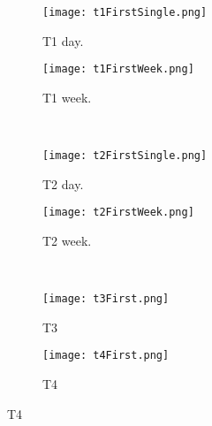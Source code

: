 \begin{figure}[!h]
  \centering
  \begin{subfigure}[b]{0.45\textwidth}
    \centering
    \texttt{[image: t1FirstSingle.png]}
    \caption{T1 day.}
  \end{subfigure}
  \begin{subfigure}[b]{0.45\textwidth}
    \centering
    \texttt{[image: t1FirstWeek.png]}
    \caption{T1 week.}
  \end{subfigure}
  \\
  \begin{subfigure}[b]{0.45\textwidth}
    \centering
    \texttt{[image: t2FirstSingle.png]}
    \caption{T2 day.}
  \end{subfigure}
  \begin{subfigure}[b]{0.45\textwidth}
    \centering
    \texttt{[image: t2FirstWeek.png]}
    \caption{T2 week.}
  \end{subfigure}
  \\
  \begin{subfigure}[b]{0.45\textwidth}
    \centering
    \texttt{[image: t3First.png]}
    \caption{T3}
  \end{subfigure}
  \begin{subfigure}[b]{0.45\textwidth}
    \centering
    \texttt{[image: t4First.png]}
    \caption{T4}
  \end{subfigure}
\end{figure}  
